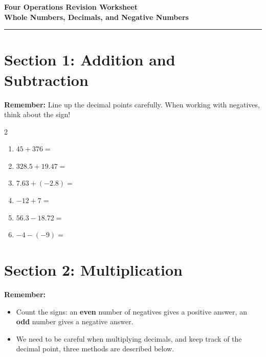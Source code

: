 \documentclass[12pt,a4paper]{article}
\begin{document}
\begin{center}
    \vspace{2em}
    {\LARGE \textbf{Four Operations Revision Worksheet}} \\[0.5em]
    \vspace{1em}
    \textbf{Whole Numbers, Decimals, and Negative Numbers} \\[0.5em]
    \vspace{1em}
 \end{center}

\hrule
\vspace{1em}

\section*{Section 1: Addition and Subtraction}

\textbf{Remember:} Line up the decimal points carefully. When working with negatives, think about the sign!

\begin{multicols}{2}
\begin{enumerate}
    \item $45 + 376 =$
    \vspace{2em}
    \item $328.5 + 19.47 =$
    \vspace{2em}
    \item $7.63 + (-2.8) =$
    \vspace{2em}
    \item $-12 + 7 =$
    \vspace{2em}
    \item $56.3 - 18.72 =$
    \vspace{2em}
    \item $-4 - (-9) =$
\end{enumerate}
\end{multicols}


\section*{Section 2: Multiplication}

\textbf{Remember:} 
\begin{itemize}
    \item Count the signs: an \textbf{even} number of negatives gives a positive answer, an \textbf{odd} number gives a negative answer.
    \item We need to be careful when multiplying decimals, and keep track of the decimal point, three methods are described below.
\end{itemize}
\end{document}
